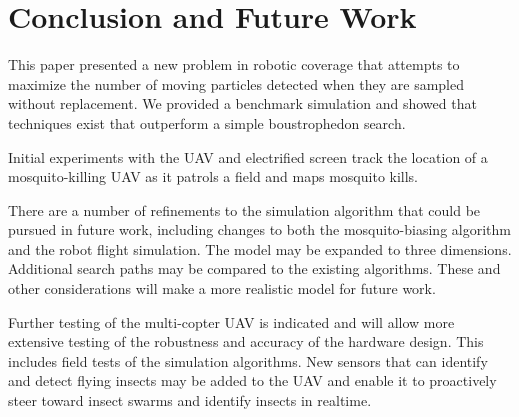 \documentclass[letterpaper, 10 pt, conference]{ieeeconf}  %
\begin{document}


\section{Conclusion and Future Work}\label{sec:conclusion}

This paper presented a new problem in robotic coverage that attempts to maximize the number of moving particles detected when they are sampled without replacement.  We provided a benchmark simulation and showed that techniques exist that outperform a simple boustrophedon search.

Initial experiments with the UAV and electrified screen track the location of a mosquito-killing UAV as it patrols a field and maps mosquito kills.  

There are a number of refinements to the simulation algorithm that could be pursued in future work, including changes to both the mosquito-biasing algorithm and the robot flight simulation.  The model may be expanded to three dimensions.  Additional search paths may be compared to the existing algorithms.  These and other considerations will make a more realistic model for future work.  

Further testing of the multi-copter UAV is indicated and will allow more extensive testing of the robustness and accuracy of the hardware design.  This includes field tests of the simulation algorithms.  New sensors that can identify and detect flying insects \cite{chen2014flying} may be added to the UAV and enable it to proactively steer toward insect swarms and identify insects in realtime.
\end{document}
